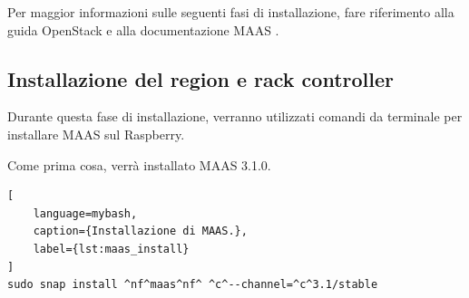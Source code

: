 \bigskip\bigskip\noindent
 Per maggior informazioni sulle seguenti fasi di installazione, fare riferimento alla guida OpenStack \cite{maas_install_openstack} e alla documentazione MAAS \cite{maas_install_doc}.


\subsection{Installazione del region e rack controller}
Durante questa fase di installazione, verranno utilizzati comandi da terminale per installare MAAS sul Raspberry.

\bigskip \noindent
Come prima cosa, verrà installato MAAS 3.1.0.
% 
\begin{lstlisting}[
    language=mybash, 
    caption={Installazione di MAAS.}, 
    label={lst:maas_install}
]
sudo snap install ^nf^maas^nf^ ^c^--channel=^c^3.1/stable
\end{lstlisting}
% 

